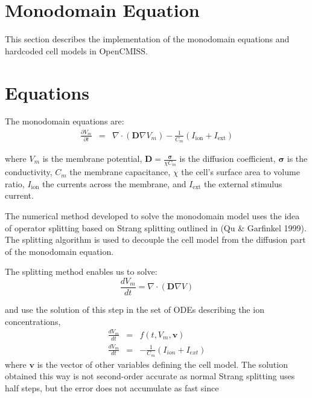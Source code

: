\section{Monodomain Equation}
 

\renewcommand{\vec}[1]{\boldsymbol{#1}}
\newcommand{\Iion}{I_{\text{ion}}}
\newcommand{\Iext}{I_{\text{ext}}}
\newcommand{\pd}[2]{\frac{\partial #1}{\partial #2}}
\newcommand{\lrbr}[1]{\left(#1\right)}
\newcommand{\dt}{\Delta t}



This section describes the implementation of the monodomain equations and hardcoded cell models in OpenCMISS.

\section{Equations}
The monodomain equations are:
\begin{eqnarray}
 \pd{V_m}{t}  &=&  \nabla \cdot \lrbr{\vec{D} \nabla V_m}  -  \frac{1}{C_m}\lrbr{\Iion + \Iext}
\end{eqnarray}

where $V_m$ is the membrane potential, $\vec{D}=\frac{\vec{\sigma}}{\chi C_m}$ is the diffusion coefficient, $\vec{\sigma}$ is the conductivity, $C_m$ the membrane capacitance, $\chi$ the cell's surface area to volume ratio, $\Iion$ the currents across the membrane, and $\Iext$ the external stimulus current.

The numerical method developed to solve the monodomain model uses the idea of operator splitting based on Strang splitting outlined in (Qu \& Garfinkel 1999). The splitting algorithm is used to decouple the cell model from the diffusion part of the monodomain equation. 
 
The splitting method enables us to solve:
\begin{equation}
\frac{d V_m}{d t} = \nabla \cdot (\mathbf{D}\nabla V)
\label{diff}
\end{equation}

and use the solution of this step in the set of ODEs describing the ion concentrations,
\begin{eqnarray}
\frac{d V_m}{d t} &=& f(t,V_m,\vec{v})\\
\frac{d V_m}{d t} &=&  - \frac{1}{C_m}(I_{ion} + I_{ext}) 
\end{eqnarray}
where $\vec{v}$ is the vector of other variables defining the cell model.
The solution obtained this way is not second-order accurate as normal Strang splitting uses half steps, but the error does not accumulate as
fast since

